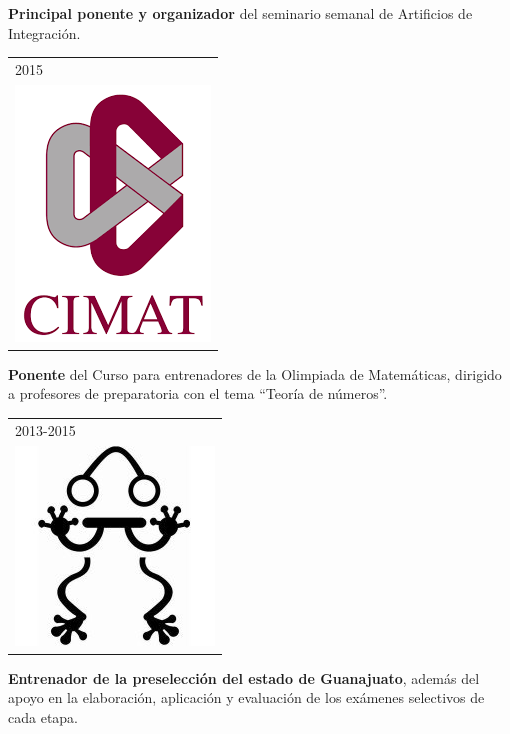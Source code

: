 \documentclass[]{friggeri-cv}
\begin{document}
\begin{entrylist}
{\begin{tabular}{l}
	\end{tabular}
    }
    {\vspace{-1.49cm}}
    { }
    {\textbf{Principal ponente y organizador} del seminario semanal de Artificios de Integración.}
\entry
     {   \begin{tabular}{l}
    		\hspace{0.9cm}2015\\
     		\hspace{0.5cm}\includegraphics[scale=0.2]{img/cimat.png}
	\end{tabular}
    }
    {\vspace{-1.4cm}}
    { }
    {\textbf{Ponente} del Curso para entrenadores de la Olimpiada de Matemáticas, dirigido a profesores de preparatoria con el tema “Teoría de números”.}
    \entry
     {   \begin{tabular}{l}
    		\hspace{0.3cm}2013-2015\\
     		\hspace{0.5cm}\includegraphics[scale=0.23]{img/ommgto.jpg}
	\end{tabular}
    }
    {\vspace{-1.27cm}}
    { }
    {\textbf{Entrenador de la preselección del estado de Guanajuato}, además del apoyo en la elaboración, aplicación y evaluación de los exámenes selectivos de cada etapa.}
\end{entrylist}
\vspace{-0.5cm}
\end{document}
